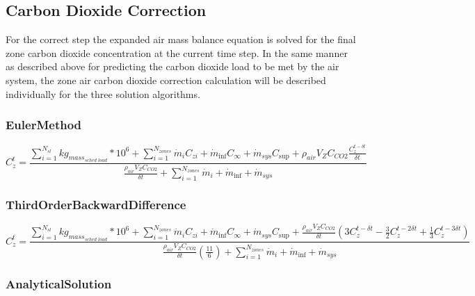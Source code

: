 \subsection{Carbon Dioxide Correction}\label{carbon-dioxide-correction}

For the correct step the expanded air mass balance equation is solved for the final zone carbon dioxide concentration at the current time step. In the same manner as described above for predicting the carbon dioxide load to be met by the air system, the zone air carbon dioxide correction calculation will be described individually for the three solution algorithms.

\subsubsection{EulerMethod}\label{eulermethod-1}

\begin{equation}
C_z^t = \frac{{\sum\limits_{i = 1}^{{N_{sl}}} {k{g_{mas{s_{sched\;load}}}}*{{10}^6}}  + \sum\limits_{i = 1}^{{N_{zones}}} {{{\dot m}_i}} {C_{zi}} + {{\dot m}_{\inf }}{C_\infty } + {{\dot m}_{sys}}{C_{\sup }} + {\rho_{air}}{V_Z}{C_{CO2}}\frac{{C_z^{t - \delta t}}}{{\delta t}}}}{{\frac{{{\rho_{air}}{V_Z}{C_{CO2}}}}{{\delta t}} + \sum\limits_{i = 1}^{{N_{zones}}} {{{\dot m}_i}}  + {{\dot m}_{\inf }} + {{\dot m}_{sys}}}}
\end{equation}

\subsubsection{ThirdOrderBackwardDifference}\label{thirdorderbackwarddifference-1}

\begin{equation}
C_z^t = \frac{{\sum\limits_{i = 1}^{{N_{sl}}} {k{g_{mas{s_{sched\;load}}}}*{{10}^6}}  + \sum\limits_{i = 1}^{{N_{zones}}} {{{\dot m}_i}} {C_{zi}} + {{\dot m}_{\inf }}{C_\infty } + {{\dot m}_{sys}}{C_{\sup }} + \frac{{{\rho_{air}}{V_Z}{C_{CO2}}}}{{\delta t}}(3C_z^{t - \delta t} - \frac{3}{2}C_z^{t - 2\delta t} + \frac{1}{3}C_z^{t - 3\delta t})}}{{\frac{{{\rho_{air}}{V_Z}{C_{CO2}}}}{{\delta t}}\left( {\frac{{11}}{6}} \right) + \sum\limits_{i = 1}^{{N_{zones}}} {{{\dot m}_i}}  + {{\dot m}_{\inf }} + {{\dot m}_{sys}}}}
\end{equation}

\subsubsection{AnalyticalSolution}\label{analyticalsolution-1}

